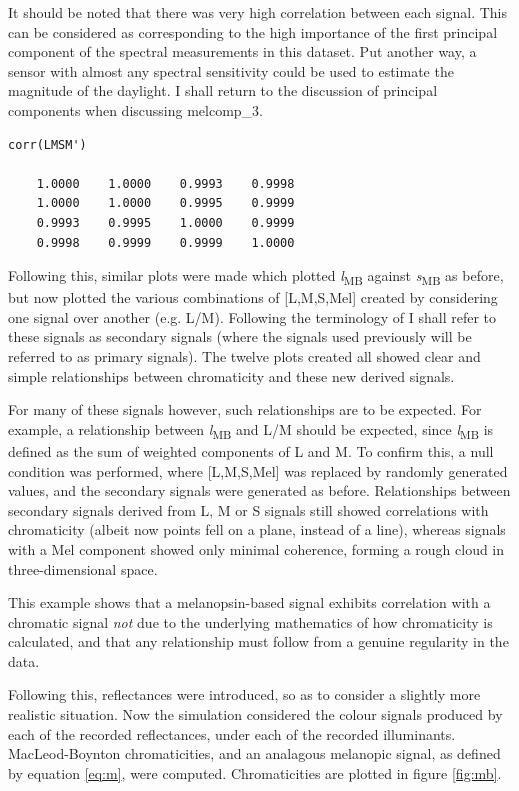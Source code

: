 \documentclass{article}
\begin{document}
It should be noted that there was very high correlation between each signal. This can be considered as corresponding to the high importance of the first principal component of the spectral measurements in this dataset. Put another way, a sensor with almost any spectral sensitivity could be used to estimate the magnitude of the daylight. I shall return to the discussion of principal components when discussing melcomp\_3.

\begin{lstlisting}
corr(LMSM')

    1.0000    1.0000    0.9993    0.9998
    1.0000    1.0000    0.9995    0.9999
    0.9993    0.9995    1.0000    0.9999
    0.9998    0.9999    0.9999    1.0000
\end{lstlisting}

Following this, similar plots were made which plotted \textit{l}\textsubscript{MB} against \textit{s}\textsubscript{MB} as before, but now plotted the various combinations of [L,M,S,Mel] created by considering one signal over another (e.g. L/M). Following the terminology of \cite{barrionuevo_contributions_2014} I shall refer to these signals as secondary signals (where the signals used previously will be referred to as primary signals). The twelve plots created all showed clear and simple relationships between chromaticity and these new derived signals.

For many of these signals however, such relationships are to be expected. For example, a relationship between \textit{l}\textsubscript{MB} and L/M should be expected, since \textit{l}\textsubscript{MB} is defined as the sum of weighted components of L and M. To confirm this, a null condition was performed, where [L,M,S,Mel] was replaced by randomly generated values, and the secondary signals were generated as before. Relationships between secondary signals derived from L, M or S signals still showed correlations with chromaticity (albeit now points fell on a plane, instead of a line), whereas signals with a Mel component showed only minimal coherence, forming a rough cloud in three-dimensional space. 

This example shows that a melanopsin-based signal exhibits correlation with a chromatic signal \emph{not} due to the underlying mathematics of how chromaticity is calculated, and that any relationship must follow from a genuine regularity in the data.

Following this, reflectances were introduced, so as to consider a slightly more realistic situation. Now the simulation considered the colour signals produced by each of the recorded reflectances, under each of the recorded illuminants. MacLeod-Boynton chromaticities, and an analagous melanopic signal, as defined by equation \ref{eq:m}, were computed. Chromaticities are plotted in figure \ref{fig:mb}.
\end{document}
